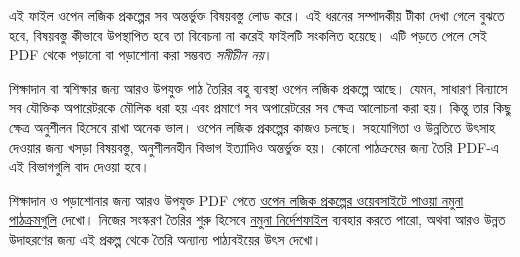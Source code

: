 \documentclass[../include/open-logic-part]{subfiles}
\begin{document}
\clearpage

\begin{editorial}
এই ফাইল ওপেন লজিক প্রকল্পের সব অন্তর্ভুক্ত বিষয়বস্তু লোড করে।
এই ধরনের সম্পাদকীয় টীকা দেখা গেলে বুঝতে হবে, বিষয়বস্তু কীভাবে
উপস্থাপিত হবে তা বিবেচনা না করেই ফাইলটি সংকলিত হয়েছে।
এটি পড়তে পেলে সেই PDF থেকে পড়ানো বা পড়াশোনা করা সম্ভবত
\emph{সমীচীন নয়}।

শিক্ষাদান বা স্বশিক্ষার জন্য আরও উপযুক্ত পাঠ তৈরির বহু ব্যবস্থা
ওপেন লজিক প্রকল্পে আছে। যেমন, সাধারণ বিন্যাসে সব যৌক্তিক অপারেটরকে
মৌলিক ধরা হয় এবং প্রমাণে সব অপারেটরের সব ক্ষেত্র আলোচনা করা হয়।
কিন্তু তার কিছু ক্ষেত্র অনুশীলন হিসেবে রাখা অনেক ভাল।
ওপেন লজিক প্রকল্পের কাজও চলছে। সহযোগিতা ও উন্নতিতে উৎসাহ দেওয়ার
জন্য খসড়া বিষয়বস্তু, অনুশীলনহীন বিভাগ ইত্যাদিও অন্তর্ভুক্ত হয়।
কোনো পাঠক্রমের জন্য তৈরি PDF-এ এই বিভাগগুলি বাদ দেওয়া হবে।

শিক্ষাদান ও পড়াশোনার জন্য আরও উপযুক্ত PDF পেতে
\href{http://builds.openlogicproject.org/}{ওপেন লজিক প্রকল্পের
ওয়েবসাইটে পাওয়া নমুনা পাঠক্রমগুলি} দেখো। নিজের সংস্করণ তৈরির
শুরু হিসেবে
\href{https://github.com/OpenLogicProject/OpenLogic/tree/master/courses/sample}{নমুনা
নির্দেশফাইল} ব্যবহার করতে পারো, অথবা আরও উন্নত উদাহরণের জন্য
এই প্রকল্প থেকে তৈরি অন্যান্য পাঠ্যবইয়ের উৎস দেখো।
\end{editorial}


















\end{document}
